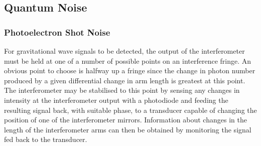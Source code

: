 \documentclass{article}
\begin{document}

\subsection{Quantum Noise}
\label{subsection:quantumnoise}

\subsubsection{Photoelectron Shot Noise}
\label{subsubsection:shotnoise}

For gravitational wave signals to be detected, the output of the interferometer
must be held at one of a number of possible points on an interference fringe. An
obvious point to choose is halfway up a fringe since the change in photon number
produced by a given differential change in arm length is greatest at this
point. The interferometer may be stabilised to this point by sensing any changes
in intensity at the interferometer output with a photodiode and feeding the
resulting signal back, with suitable phase, to a transducer capable of changing
the position of one of the interferometer mirrors.  Information about changes in
the length of the interferometer arms can then be obtained by monitoring the
signal fed back to the transducer.
\end{document}
